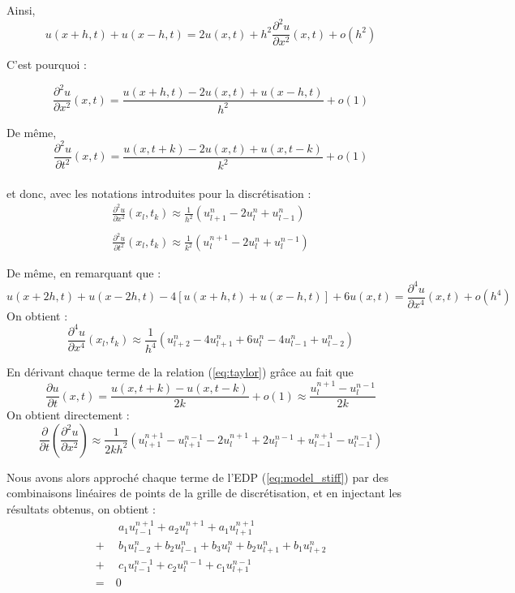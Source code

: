 \documentclass[a4,12pt]{article}
\begin{document}
Ainsi,
\[
u(x+h,t)+u(x-h,t)=2u(x,t)+h^2 \frac{\partial^2 u}{\partial x^2}(x,t)+o(h^2)
\]

C'est pourquoi :

\begin{equation}
  \frac{\partial^2 u}{\partial x^2}(x,t)=\frac{u(x+h,t)-2u(x,t)+u(x-h,t)}{h^2}+o(1)
  \label{eq:taylor}
\end{equation}

De même, 
\begin{equation*}
  \frac{\partial^2 u}{\partial t^2}(x,t)=\frac{u(x,t+k)-2u(x,t)+u(x,t-k)}{k^2}+o(1)
\end{equation*}\\

et donc, avec les notations introduites pour la discrétisation :
\[
  \begin{array}{l}
    \displaystyle \frac{\partial^2 u}{\partial x^2}(x_l,t_k)\approx \frac{1}{h^2}(u_{l+1}^n-2u_l^n+u_{l-1}^n)\\ \\ 		\displaystyle \frac{\partial^2 u}{\partial t^2}(x_l,t_k)\approx \frac{1}{k^2}(u_{l}^{n+1}-2u_l^n+u_{l}^{n-1})\end{array}
\]

De même, en remarquant que : $$u(x+2h,t)+u(x-2h,t)-4[u(x+h,t)+u(x-h,t)]+6u(x,t) = \frac{\partial^4 u}{\partial x^4}(x,t) + o(h^4)$$ On obtient :
\[
  \frac{\partial^4 u}{\partial x^4}(x_l,t_k)\approx \frac{1}{h^4}(u_{l+2}^n-4u_{l+1}^n+6u_l^n-4u_{l-1}^n+u_{l-2}^n)
\]

En dérivant chaque terme de la relation (\ref{eq:taylor}) grâce au fait que 
\[
  \frac{\partial u}{\partial t}(x,t)=\frac{u(x,t+k)-u(x,t-k)}{2k}+o(1) \approx \frac{u_l^{n+1}-u_l^{n-1}}{2k}
\]
On obtient directement :
\[
  \frac{\partial}{\partial t}\left(\frac{\partial^2 u}{\partial x^2}\right)\approx \frac{1}{2kh^2}(u_{l+1}^{n+1}-u_{l+1}^{n-1}-2u_{l}^{n+1}+2u_l^{n-1}+u_{l-1}^{n+1}-u_{l-1}^{n-1})
\]

Nous avons alors approché chaque terme de l'EDP (\ref{eq:model_stiff}) par des combinaisons linéaires de points de la grille de discrétisation, et en injectant les résultats obtenus, on obtient :
\begin{align}
  &~~a_1u_{l-1}^{n+1}+a_2u_l^{n+1}+a_1u_{l+1}^{n+1}\\
  +& ~~b_1u_{l-2}^n+b_2u_{l-1}^n+b_3u_l^n+b_2u_{l+1}^n+b_1u_{l+2}^n\\ 
  +&~~ c_1u_{l-1}^{n-1}+c_2u_l^{n-1}+c_1u_{l+1}^{n-1}\\ 
  =&~0
\end{align}
\end{document}
